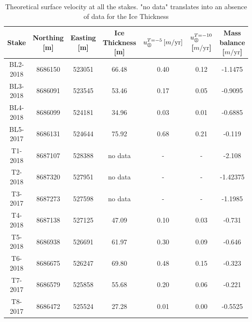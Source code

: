 \begin{table}
    \centering
    \footnotesize
	\begin{tabular}{c|c|c|c|c|c|c}
Stake & Northing [m] & Easting [m] & Ice Thickness [m] & $u_\circledS^{T=-5}\,[m / \text{yr}]$ & $u_\circledS^{T=-10}$ [$m / \text{yr}$] & Mass balance [$m / \text{yr}$]\\
\hline
BL2-2018 & 8686150 & 523051 & 66.48 & 0.40 & 0.12 & -1.1475\\
BL3-2018 & 8686091 & 523545 & 53.46 & 0.17 & 0.05 & -0.9095\\
BL4-2018 & 8686099 & 524181 & 34.96 & 0.03 & 0.01 & -0.6885\\
BL5-2017 & 8686131 & 524644 & 75.92 & 0.68 & 0.21 & -0.119\\
T1-2018 & 8687107 & 528388 & no data & - & - & -2.108\\
T2-2018 & 8687320 & 527951 & no data & - & - & -1.42375\\
T3-2017 & 8687273 & 527598 & no data & - & - & -1.1985\\
T4-2018 & 8687138 & 527125 & 47.09 & 0.10 & 0.03 & -0.731\\
T5-2018 & 8686938 & 526691 & 61.97 & 0.30 & 0.09 & -0.646\\
T6-2018 & 8686675 & 526247 & 69.80 & 0.48 & 0.15 & -0.323\\
T7-2017 & 8686579 & 525858 & 55.68 & 0.20 & 0.06 & -0.221\\
T8-2017 & 8686472 & 525524 & 27.28 & 0.01 & 0.00 & -0.5525
	\end{tabular}
	\caption{Theoretical surface velocity at all the stakes. "no data" translates into an absence of data for the Ice Thickness}
	\label{stakesvelocities}
\end{table}

